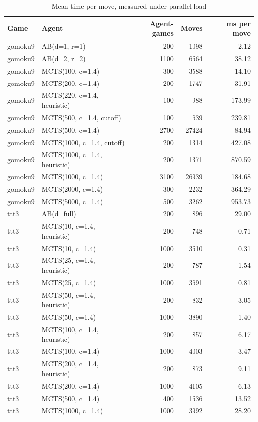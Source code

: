 \begin{table}[!t]
\centering
\caption{Mean time per move, measured under parallel load}
\label{tab:timing}
\small
\begin{tabular}{llrrr}
\toprule
Game & Agent & Agent-games & Moves & ms per move \\
\midrule
gomoku9 & AB(d=1, r=1) & 200 & 1098 & 2.12 \\
gomoku9 & AB(d=2, r=2) & 1100 & 6564 & 38.12 \\
gomoku9 & MCTS(100, c=1.4) & 300 & 3588 & 14.10 \\
gomoku9 & MCTS(200, c=1.4) & 200 & 1747 & 31.91 \\
gomoku9 & MCTS(220, c=1.4, heuristic) & 100 & 988 & 173.99 \\
gomoku9 & MCTS(500, c=1.4, cutoff) & 100 & 639 & 239.81 \\
gomoku9 & MCTS(500, c=1.4) & 2700 & 27424 & 84.94 \\
gomoku9 & MCTS(1000, c=1.4, cutoff) & 200 & 1314 & 427.08 \\
gomoku9 & MCTS(1000, c=1.4, heuristic) & 200 & 1371 & 870.59 \\
gomoku9 & MCTS(1000, c=1.4) & 3100 & 26939 & 184.68 \\
gomoku9 & MCTS(2000, c=1.4) & 300 & 2232 & 364.29 \\
gomoku9 & MCTS(5000, c=1.4) & 500 & 3262 & 953.73 \\
ttt3 & AB(d=full) & 200 & 896 & 29.00 \\
ttt3 & MCTS(10, c=1.4, heuristic) & 200 & 748 & 0.71 \\
ttt3 & MCTS(10, c=1.4) & 1000 & 3510 & 0.31 \\
ttt3 & MCTS(25, c=1.4, heuristic) & 200 & 787 & 1.54 \\
ttt3 & MCTS(25, c=1.4) & 1000 & 3691 & 0.81 \\
ttt3 & MCTS(50, c=1.4, heuristic) & 200 & 832 & 3.05 \\
ttt3 & MCTS(50, c=1.4) & 1000 & 3890 & 1.40 \\
ttt3 & MCTS(100, c=1.4, heuristic) & 200 & 857 & 6.17 \\
ttt3 & MCTS(100, c=1.4) & 1000 & 4003 & 3.47 \\
ttt3 & MCTS(200, c=1.4, heuristic) & 200 & 873 & 9.11 \\
ttt3 & MCTS(200, c=1.4) & 1000 & 4105 & 6.13 \\
ttt3 & MCTS(500, c=1.4) & 400 & 1536 & 13.52 \\
ttt3 & MCTS(1000, c=1.4) & 1000 & 3992 & 28.20 \\

\end{tabular}
\end{table}
